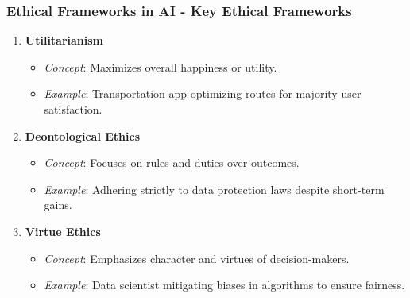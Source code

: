 \documentclass[aspectratio=169]{beamer}
\begin{document}
\begin{frame}[fragile]
    \frametitle{Ethical Frameworks in AI - Key Ethical Frameworks}
    \begin{enumerate}
        \item \textbf{Utilitarianism}
            \begin{itemize}
                \item \textit{Concept}: Maximizes overall happiness or utility.
                \item \textit{Example}: Transportation app optimizing routes for majority user satisfaction.
            \end{itemize}
        \item \textbf{Deontological Ethics}
            \begin{itemize}
                \item \textit{Concept}: Focuses on rules and duties over outcomes.
                \item \textit{Example}: Adhering strictly to data protection laws despite short-term gains.
            \end{itemize}
        \item \textbf{Virtue Ethics}
            \begin{itemize}
                \item \textit{Concept}: Emphasizes character and virtues of decision-makers.
                \item \textit{Example}: Data scientist mitigating biases in algorithms to ensure fairness.
            \end{itemize}
    \end{enumerate}
\end{frame}
\end{document}
